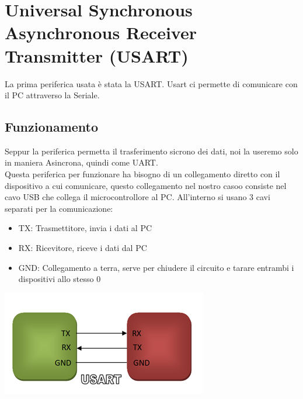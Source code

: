 
\section{Universal Synchronous Asynchronous Receiver Transmitter (USART)}
La prima periferica usata è stata la USART. Usart ci permette di comunicare con il PC attraverso la Seriale.
\\

\subsection{Funzionamento}
Seppur la periferica permetta il trasferimento sicrono dei dati, noi la useremo solo in maniera Asincrona, quindi come UART.\\

Questa periferica per funzionare ha bisogno di un collegamento diretto con il dispositivo a cui comunicare, questo collegamento nel nostro casoo consiste nel cavo USB che collega il microcontrollore al PC. All'interno si usano 3 cavi separati per la comunicazione:


\noindent
\begin{minipage}[c]{0.54\linewidth}
    \begin{itemize}
        \item TX: Trasmettitore, invia i dati al PC
        \item RX: Ricevitore, riceve i dati dal PC
        \item GND: Collegamento a terra, serve per chiudere il circuito e tarare entrambi i dispositivi allo stesso 0
    \end{itemize}
\end{minipage}
\hfill
\begin{minipage}[t]{0.4\linewidth}

    \centering
    \includegraphics[width=0.7\linewidth]{microcontrollore/assets/USART.png}
    \label{fig:USART}
\end{minipage}


